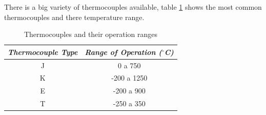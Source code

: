 	There is a big variety of thermocouples available, table \ref{table:thermocouple} shows the most common thermocouples and there temperature range.

	\begin{table}[h!]
		\centering
		\caption{Thermocouples and their operation ranges}
		\label{table:thermocouple}
		\begin{tabular}{|c|c|}
			\hline
			\textit{\textbf{Thermocouple Type}} & \textit{\textbf{Range of Operation ($^{\circ}$C)}} \\ \hline
			J & 0 a 750 \\ \hline
			K & -200 a 1250 \\ \hline
			E & -200 a 900 \\ \hline
			T & -250 a 350 \\ \hline
		\end{tabular}
	\end{table}
